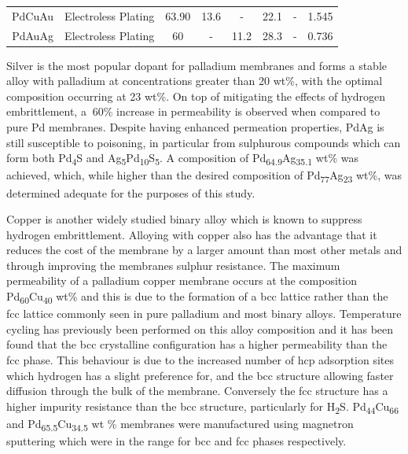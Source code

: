 \begin{table}[]
{\begin{tabular}{@{}cccccccc@{}}
    PdCuAu                                            & Electroless Plating                      & 63.90     & 13.6      & -         & 22.1      & -        & 1.545                           \\
    PdAuAg                                            & Electroless Plating                      & 60        & -         & 11.2      & 28.3      & -        & 0.736                           \\ \bottomrule
    \end{tabular}}
\end{table}

Silver is the most popular dopant for palladium membranes and forms a stable alloy with palladium at concentrations greater than 20 wt\%, with the optimal composition occurring at 23 wt\%. On top of mitigating the effects of hydrogen embrittlement, a $~$60\% increase in permeability is observed when compared to pure Pd membranes. Despite having enhanced permeation properties, PdAg is still susceptible to poisoning, in particular from sulphurous compounds which can form both Pd\textsubscript{4}S and Ag\textsubscript{5}Pd\textsubscript{10}S\textsubscript{5}. A composition of Pd\textsubscript{64.9}Ag\textsubscript{35.1} wt\% was achieved, which, while higher than the desired composition of Pd\textsubscript{77}Ag\textsubscript{23} wt\%, was determined adequate for the purposes of this study.

Copper is another widely studied binary alloy which is known to suppress hydrogen embrittlement. Alloying with copper also has the advantage that it reduces the cost of the membrane by a larger amount than most other metals and through improving the membranes sulphur resistance. The maximum permeability of a palladium copper membrane occurs at the composition Pd\textsubscript{60}Cu\textsubscript{40} wt\% and this is due to the formation of a bcc lattice rather than the fcc lattice commonly seen in pure palladium and most binary alloys. \cite{She2014} Temperature cycling has previously been performed on this alloy composition and it has been found that the bcc crystalline configuration has a higher permeability than the fcc phase. \cite{Dolan2010} This behaviour is due to the increased number of hcp adsorption sites which hydrogen has a slight preference for, and the bcc structure allowing faster diffusion through the bulk of the membrane. \cite{Wilcox2010} Conversely the fcc structure has a higher impurity resistance than the bcc structure, particularly for H\textsubscript{2}S. \cite{She2014, D.T.Hughes1978} Pd\textsubscript{44}Cu\textsubscript{66} and Pd\textsubscript{65.5}Cu\textsubscript{34.5} wt \%  membranes were manufactured using magnetron sputtering which were in the range for bcc and fcc phases respectively.

